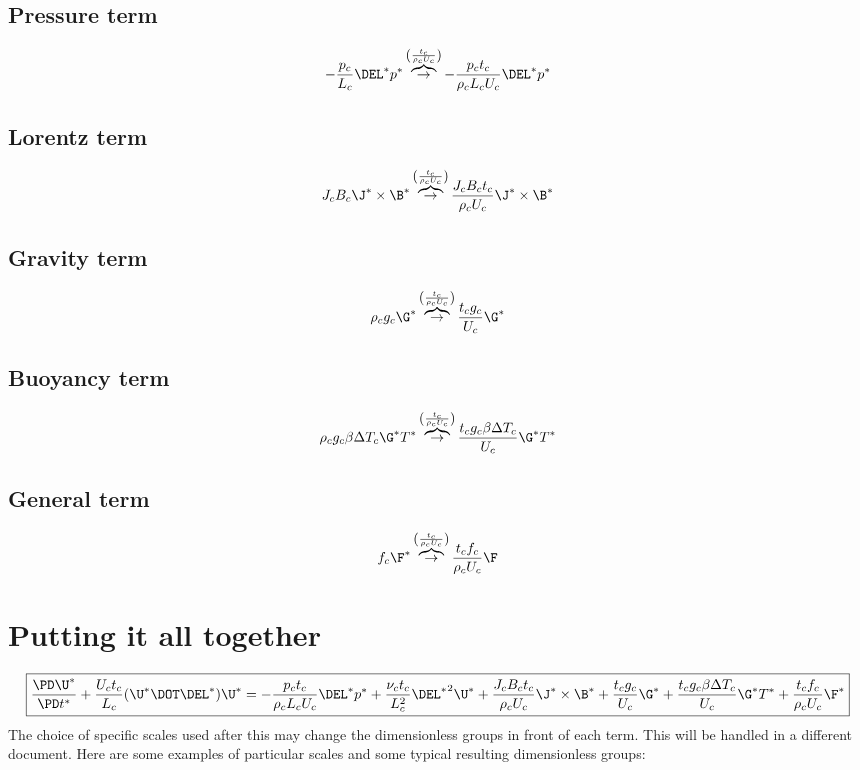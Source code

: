 \documentclass[11pt]{article}
\newcommand{\OB}{\overbrace{\rightarrow}^{\left(\frac{t_c}{\rho_c U_c}\right)}}
\begin{document}
\subsection{Pressure term}
\begin{equation}
	- \frac{p_c}{L_c} \DEL^*  p^*
	\OB
	- \frac{p_c t_c}{\rho_c L_c U_c} \DEL^*  p^*
\end{equation}
\subsection{Lorentz term}
\begin{equation}
	J_c B_c \J^* \times \B^*
	\OB
	\frac{J_c B_c t_c}{\rho_c U_c} \J^* \times \B^*
\end{equation}
\subsection{Gravity term}
\begin{equation}
	\rho_c g_c \G^*
	\OB
	\frac{t_c g_c}{U_c} \G^*
\end{equation}
\subsection{Buoyancy term}
\begin{equation}
	\rho_c g_c \beta \Delta T_c \G^* T^*
	\OB
	\frac{t_c g_c \beta \Delta T_c}{U_c} \G^* T^*
\end{equation}
\subsection{General term}
\begin{equation}
	f_c \F^*
	\OB
	\frac{t_c f_c}{\rho_c U_c} \F
\end{equation}

\section{Putting it all together}

\begin{equation}
	\boxed{
	\frac{\PD \U^*}{\PD t^*}
	+ \frac{U_c t_c}{L_c} (\U^* \DOT \DEL^*) \U^* =
	- \frac{p_c t_c}{\rho_c L_c U_c} \DEL^*  p^*
	+ \frac{\nu_c t_c}{L_c^2} {\DEL^*}^2 \U^*
	+ \frac{J_c B_c t_c}{\rho_c U_c} \J^* \times \B^*
	+ \frac{t_c g_c}{U_c} \G^*
	+ \frac{t_c g_c \beta \Delta T_c}{U_c} \G^* T^*
	+ \frac{t_c f_c}{\rho_c U_c} \F^*
	}
\end{equation}
The choice of specific scales used after this may change the dimensionless groups in front of each term. This will be handled in a different document. Here are some examples of particular scales and some typical resulting dimensionless groups:
\end{document}
